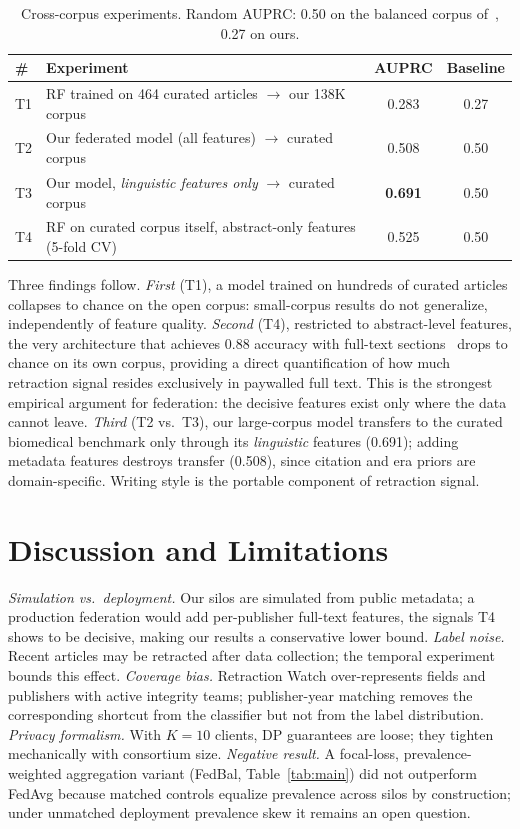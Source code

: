 \documentclass[review,12pt]{elsarticle}
\begin{document}
\begin{table}[t]
\centering
\caption{Cross-corpus experiments. Random AUPRC: 0.50 on the balanced
corpus of~\cite{ref_usman_websci25}, 0.27 on ours.}
\label{tab:transfer}
\small
\begin{tabular}{@{}lp{6.5cm}cc@{}}
\toprule
\# & Experiment & AUPRC & Baseline \\
\midrule
T1 & RF trained on 464 curated articles $\rightarrow$ our 138K corpus &
0.283 & 0.27 \\
T2 & Our federated model (all features) $\rightarrow$ curated corpus &
0.508 & 0.50 \\
T3 & Our model, \emph{linguistic features only} $\rightarrow$ curated corpus &
\textbf{0.691} & 0.50 \\
T4 & RF on curated corpus itself, abstract-only features (5-fold CV) &
0.525 & 0.50 \\
\bottomrule
\end{tabular}
\end{table}

Three findings follow. \emph{First} (T1), a model trained on hundreds of
curated articles collapses to chance on the open corpus: small-corpus results
do not generalize, independently of feature quality. \emph{Second} (T4),
restricted to abstract-level features, the very architecture that achieves
0.88 accuracy with full-text sections~\cite{ref_usman_websci25} drops to
chance on its own corpus, providing a direct quantification of how much
retraction signal resides exclusively in paywalled full text. This is
the strongest empirical argument for federation: the decisive features exist
only where the data cannot leave. \emph{Third} (T2 vs.\ T3), our large-corpus
model transfers to the curated biomedical benchmark only through its
\emph{linguistic} features (0.691); adding metadata features destroys
transfer (0.508), since citation and era priors are domain-specific. Writing
style is the portable component of retraction signal.

\section{Discussion and Limitations}
\label{sec:discussion}
\emph{Simulation vs.\ deployment.} Our silos are simulated from public
metadata; a production federation would add per-publisher full-text
features, the signals T4 shows to be decisive, making our results a
conservative lower bound. \emph{Label noise.} Recent articles may be
retracted after data collection; the temporal experiment bounds this effect.
\emph{Coverage bias.} Retraction Watch over-represents fields and publishers
with active integrity teams; publisher-year matching removes the
corresponding shortcut from the classifier but not from the label
distribution. \emph{Privacy formalism.} With $K{=}10$ clients, DP guarantees
are loose; they tighten mechanically with consortium size. \emph{Negative
result.} A focal-loss, prevalence-weighted aggregation variant (FedBal,
Table~\ref{tab:main}) did not outperform FedAvg because matched controls
equalize prevalence across silos by construction; under unmatched deployment
prevalence skew it remains an open question.
\end{document}
